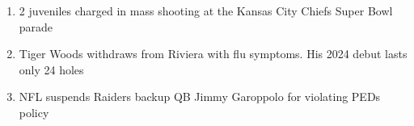 \begin{enumerate}
\item 2 juveniles charged in mass shooting at the Kansas City Chiefs Super Bowl parade
\item Tiger Woods withdraws from Riviera with flu symptoms. His 2024 debut lasts only 24 holes
\item NFL suspends Raiders backup QB Jimmy Garoppolo for violating PEDs policy\end{enumerate}